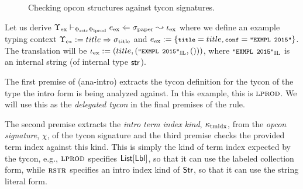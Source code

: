 \documentclass[10pt,preprint]{sigplanconf}
\begin{document}
\begin{figure*}[t]
\small\fbox{$\vdash_\Phi \omega \sim \psi$}
\vspace{-25px}
\begin{mathpar}\small
\hspace{50px}

\vspace{-5px}
\end{mathpar}
\caption{Checking opcon structures against tycon signatures.}
\label{ocstruct}
\end{figure*}
Let us derive $\small\eana{\Upsilon_\text{ex}}{\Phi_\text{rstr}\Phi_\text{lprod}}{e_\text{ex}}{\stx{paper}}{\iota_\text{ex}}$ where we define an example typing context $\small\Upsilon_\text{ex}  := title \Rightarrow \stx{title}$ and $\small e_\text{ex} := \{\conclbl{title}=title, \conclbl{conf}=\texttt{"EXMPL 2015"}\}$. The  translation will be $\small\iota_\text{ex} := (title, (\texttt{"EXMPL 2015"}_\text{IL}, ()))$, where $\small\texttt{"EXMPL 2015"}_\text{IL}$ is an internal string (of internal type $\keyw{str}$). 

The first premise of (ana-intro) extracts the tycon definition for the tycon of the type the intro form is being analyzed against. In this example, this is $\tcvar{lprod}$. We will use this as the \emph{delegated tycon} in the final premises of the rule.

The second premise extracts the \emph{intro term index kind}, $\klitidx$, from the \emph{opcon signature}, $\chi$, of the tycon signature and the third premise checks the provided term index against this kind. This is simply the kind of term index expected by the tycon, e.g., $\tcvar{lprod}$ specifies $\klist{\klbl}$, so that it can use the labeled collection form, while $\tcvar{rstr}$ specifies an intro index kind of $\keyw{Str}$, so that it can use the string literal form. %
\end{document}
